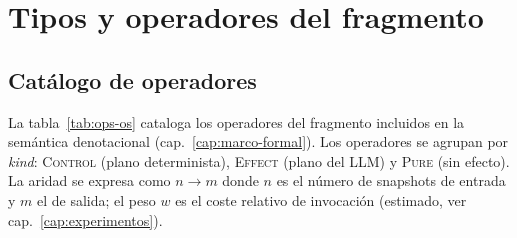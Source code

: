 
\chapter{Tipos y operadores del fragmento }
\label{app:tipos-operadores}


\section{Catálogo de operadores}

La tabla~\ref{tab:ops-os} cataloga los operadores del fragmento 
incluidos en la semántica denotacional (cap.~\ref{cap:marco-formal}). Los
operadores se agrupan por \emph{kind}: \textsc{Control} (plano determinista),
\textsc{Effect} (plano del LLM) y \textsc{Pure} (sin efecto). La aridad se
expresa como $n{\to}m$ donde $n$ es el número de snapshots de entrada y $m$ el
de salida; el peso $w$ es el coste relativo de invocación (estimado, ver
cap.~\ref{cap:experimentos}).

